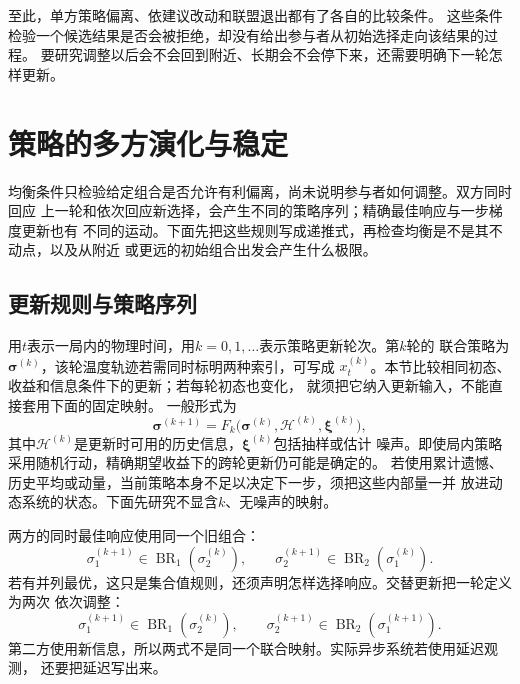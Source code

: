 至此，单方策略偏离、依建议改动和联盟退出都有了各自的比较条件。
这些条件检验一个候选结果是否会被拒绝，却没有给出参与者从初始选择走向该结果的过程。
要研究调整以后会不会回到附近、长期会不会停下来，还需要明确下一轮怎样更新。

\section{策略的多方演化与稳定}
\label{sec:game-policy-evolution}

均衡条件只检验给定组合是否允许有利偏离，尚未说明参与者如何调整。双方同时回应
上一轮和依次回应新选择，会产生不同的策略序列；精确最佳响应与一步梯度更新也有
不同的运动。下面先把这些规则写成递推式，再检查均衡是不是其不动点，以及从附近
或更远的初始组合出发会产生什么极限。

\subsection{更新规则与策略序列}
\label{sec:game-update-sequences}

用\(t\)表示一局内的物理时间，用\(k=0,1,\ldots\)表示策略更新轮次。第\(k\)轮的
联合策略为\(\bm\sigma^{(k)}\)，该轮温度轨迹若需同时标明两种索引，可写成
\(x_t^{(k)}\)。本节比较相同初态、收益和信息条件下的更新；若每轮初态也变化，
就须把它纳入更新输入，不能直接套用下面的固定映射。
一般形式为
\[
  \bm\sigma^{(k+1)}
  =F_k\bigl(\bm\sigma^{(k)},\mathcal H^{(k)},\bm\xi^{(k)}\bigr),
\]
其中\(\mathcal H^{(k)}\)是更新时可用的历史信息，\(\bm\xi^{(k)}\)包括抽样或估计
噪声。即使局内策略采用随机行动，精确期望收益下的跨轮更新仍可能是确定的。
若使用累计遗憾、历史平均或动量，当前策略本身不足以决定下一步，须把这些内部量一并
放进动态系统的状态。下面先研究不显含\(k\)、无噪声的映射。

两方的同时最佳响应使用同一个旧组合：
\begin{equation}
  \sigma_1^{(k+1)}\in\operatorname{BR}_1(\sigma_2^{(k)}),
  \qquad
  \sigma_2^{(k+1)}\in\operatorname{BR}_2(\sigma_1^{(k)}).
  \label{eq:game-simultaneous-best-response}
\end{equation}
若有并列最优，这只是集合值规则，还须声明怎样选择响应。交替更新把一轮定义为两次
依次调整：
\begin{equation}
  \sigma_1^{(k+1)}\in\operatorname{BR}_1(\sigma_2^{(k)}),
  \qquad
  \sigma_2^{(k+1)}\in\operatorname{BR}_2(\sigma_1^{(k+1)}).
  \label{eq:game-alternating-best-response}
\end{equation}
第二方使用新信息，所以两式不是同一个联合映射。实际异步系统若使用延迟观测，
还要把延迟写出来。

